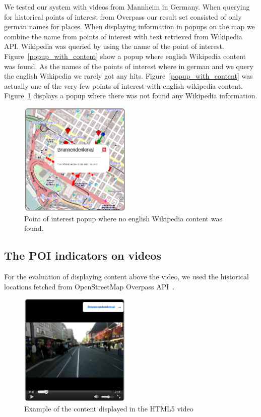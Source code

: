 \documentclass[journal]{IEEEtran}
\begin{document}
We tested our system with videos from Mannheim in Germany. When querying for historical points of interest from Overpass\cite{overpass} our result set consisted of only german names for places. When displaying information in popups on the map we combine the name from points of interest with text retrieved from Wikipedia API\cite{wikiapi}. Wikipedia was queried by using the name of the point of interest. Figure~\ref{popup_with_content} show a popup where english Wikipedia content was found. 
As the names of the points of interest where in german and we query the english Wikipedia we rarely got any hits. Figure~\ref{popup_with_content} was actually one of the very few points of interest with english wikipedia content. Figure~\ref{popup_wo_content} displays a popup where there was not found any Wikipedia information.

        \begin{figure}[htb]
         \centering
         \includegraphics[width=200px]{popup_wo_content}
         \caption{Point of interest popup where no english Wikipedia content was found.}
         \label{popup_wo_content}
        \end{figure}

\subsection{The POI indicators on videos}

For the evaluation of displaying content above the video, we used the historical locations fetched from OpenStreetMap Overpass API~\cite{overpass}.

	   \begin{figure}[htb]
         \centering
         \includegraphics[width=200px]{video_with_info}
         \caption{Example of the content displayed in the HTML5 video}
         \label{video_with_info}
        \end{figure}
\end{document}
